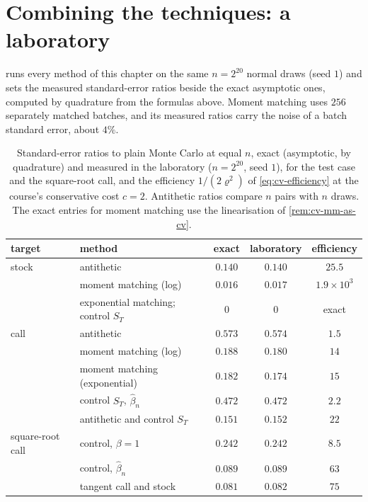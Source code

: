 \section{Combining the techniques: a laboratory}\label{sec:cv-lab}

 runs every method of this chapter on the same $n=2^{20}$ normal draws
(seed $1$) and sets the measured standard-error ratios beside the exact asymptotic ones,
computed by quadrature from the formulas above. Moment matching uses $256$ separately matched
batches, and its measured ratios carry the noise of a batch standard error, about $4\%$.

\begin{table}[ht]
  \centering
  \small
  \begin{tabular}{@{}llccc@{}}
    \toprule
    target & method & exact & laboratory & efficiency \\
    \midrule
    stock & antithetic & $0.140$ & $0.140$ & $25.5$ \\
     & moment matching (log) & $0.016$ & $0.017$ & $1.9\times10^3$ \\
     & exponential matching; control $S_T$ & $0$ & $0$ & exact \\
    \midrule
    call & antithetic & $0.573$ & $0.574$ & $1.5$ \\
     & moment matching (log) & $0.188$ & $0.180$ & $14$ \\
     & moment matching (exponential) & $0.182$ & $0.174$ & $15$ \\
     & control $S_T$, $\hat\beta_n$ & $0.472$ & $0.472$ & $2.2$ \\
     & antithetic and control $S_T$ & $0.151$ & $0.152$ & $22$ \\
    \midrule
    square-root call & control, $\beta=1$ & $0.242$ & $0.242$ & $8.5$ \\
     & control, $\hat\beta_n$ & $0.089$ & $0.089$ & $63$ \\
     & tangent call and stock & $0.081$ & $0.082$ & $75$ \\
    \bottomrule
  \end{tabular}
  \caption{Standard-error ratios to plain Monte Carlo at equal $n$, exact (asymptotic, by
    quadrature) and measured in the laboratory ($n=2^{20}$, seed $1$), for the test case and
    the square-root call, and the efficiency $1/(2\varrho^2)$ of \eqref{eq:cv-efficiency} at
    the course's conservative cost $c=2$. Antithetic ratios compare $n$ pairs with $n$ draws.
    The exact entries for moment matching use the linearisation of \cref{rem:cv-mm-as-cv}.}
  \label{tab:cv-lab}
\end{table}

